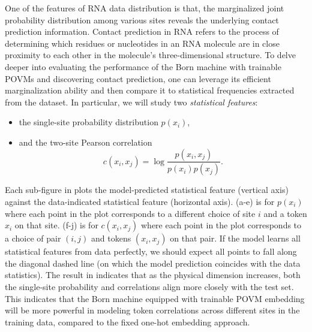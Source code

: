 One of the features of RNA data distribution is that, the marginalized joint probability distribution among various sites reveals the underlying contact prediction information\cite{trinquier2021efficient}. Contact prediction in RNA refers to the process of determining which residues or nucleotides in an RNA molecule are in close proximity to each other in the molecule's three-dimensional structure. To delve deeper into evaluating the performance of the Born machine with trainable POVMs and discovering contact prediction, one can leverage its efficient marginalization ability  and then compare it to statistical frequencies extracted from the dataset. In particular, we will study two \textit{statistical features}:
\begin{itemize}
\item the single-site probability distribution $p(x_i)$,
\item and the two-site Pearson correlation
\begin{equation}\label{eq: corre}
    c(x_i,x_j)=\log\frac{p(x_i,x_j)}{p(x_i)p(x_j)}.
\end{equation}
\end{itemize}
Each sub-figure in  plots the model-predicted statistical feature (vertical axis) against the data-indicated statistical feature (horizontal axis). (a-e) is for $p(x_i)$ where each point in the plot corresponds to a different choice of site $i$ and a token $x_i$ on that site. (f-j) is for $c(x_i,x_j)$ where each point in the plot corresponds to a choice of pair $(i,j)$ and tokens $(x_i,x_j)$ on that pair. If the model learns all statistical features from data perfectly, we should expect all points to fall along the diagonal dashed line (on which the model prediction coincides with the data statistics).  The result in  indicates that as the physical dimension increases, both the single-site probability and correlations align more closely with the test set. This indicates that the Born machine equipped with trainable POVM embedding will be more powerful in modeling token correlations across different sites in the training data, compared to the fixed one-hot embedding approach.


